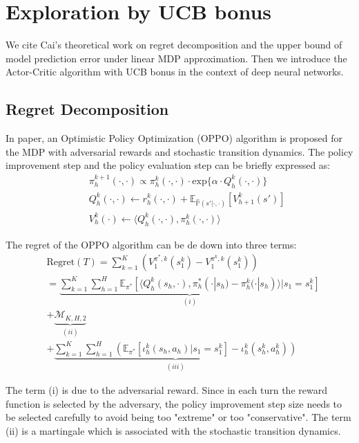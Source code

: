 \section{Exploration by UCB bonus}
We cite Cai's \cite{cai2019provably} theoretical work on regret decomposition and the upper bound of model prediction error under linear MDP approximation. Then we introduce the Actor-Critic algorithm with UCB bonus in the context of deep neural networks.

\subsection{Regret Decomposition}
In \cite{cai2019provably} paper, an Optimistic Policy Optimization (OPPO) algorithm is proposed for the MDP with adversarial rewards and stochastic transition dynamics. The policy improvement step and the policy evaluation step can be briefly expressed as:
\begin{eqnarray}
    &&\pi_h^{k+1}(\cdot,\cdot)\propto \pi_h^k(\cdot,\cdot)\cdot \text{exp}\{\alpha\cdot Q_h^k(\cdot,\cdot)\}\\
    &&Q_h^k(\cdot,\cdot)\leftarrow r_h^k(\cdot,\cdot)+\mathbb{E}_{\hat{\mathbb{P}}(s'|\cdot,\cdot)}[V^k_{h+1}(s')]\\
    &&V^k_h(\cdot)\leftarrow \langle Q_h^k(\cdot,\cdot),\pi^k_h(\cdot,\cdot)\rangle
\end{eqnarray}


The regret of the OPPO algorithm can be de down into three terms:
\begin{equation}
    \begin{split}
        &\text{Regret}(T)=\sum_{k=1}^K(V_1^{\pi^*,k}(s^k_1)-V_1^{\pi^k,k}(s^k_1))\\
        &=\underbrace{\sum_{k=1}^K\sum_{h=1}^H\mathbb{E}_{\pi^*}[\langle Q^k_h(s_h,\cdot),\pi^*_h(\cdot|s_h)-\pi^k_h(\cdot|s_h) \rangle|s_1=s_1^k]}_{(i)}\\
        &+\underbrace{\mathcal{M}_{K,H,2}}_{(ii)}\\
        &+\underbrace{\sum_{k=1}^K\sum_{h=1}^H(\mathbb{E}_{\pi^*}[\iota_h^k(s_h,a_h)|s_1=s_1^k]-\iota_h^k(s_h^k,a_h^k))}_{(iii)}
    \end{split}\label{eq:regret}
\end{equation}

The term (i) is due to the adversarial reward. Since in each turn the reward function is selected by the adversary, the policy improvement step size needs to be selected carefully to avoid being too "extreme" or too "conservative". The term (ii) is a martingale which is associated with the stochastic transition dynamics.

